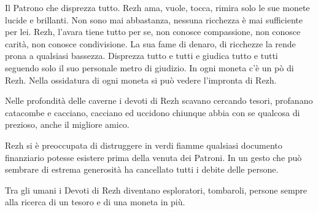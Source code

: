 \begin{multicols}{2}
Il Patrono che disprezza tutto. Rezh ama, vuole, tocca, rimira solo le sue monete lucide e brillanti. Non sono mai abbastanza, nessuna ricchezza è mai sufficiente per lei. Rezh, l'avara tiene tutto per se, non conosce compassione, non conosce carità, non conosce condivisione. La sua fame di denaro, di ricchezze la rende prona a qualsiasi bassezza. Disprezza tutto e tutti e giudica tutto e tutti seguendo solo il suo personale metro di giudizio. In ogni moneta c'è un pò di Rezh. Nella ossidatura di ogni moneta si può vedere l'impronta di Rezh.

Nelle profondità delle caverne i devoti di Rezh scavano cercando tesori, profanano catacombe e cacciano, cacciano ed uccidono chiunque abbia con se qualcosa di prezioso, anche il migliore amico.

Rezh si è preoccupata di distruggere in verdi fiamme qualsiasi documento finanziario potesse esistere prima della venuta dei Patroni. In un gesto che può sembrare di estrema generosità ha cancellato tutti i debite delle persone.

Tra gli umani i Devoti di Rezh diventano esploratori, tombaroli, persone sempre alla ricerca di un tesoro e di una moneta in più.


\end{multicols}
